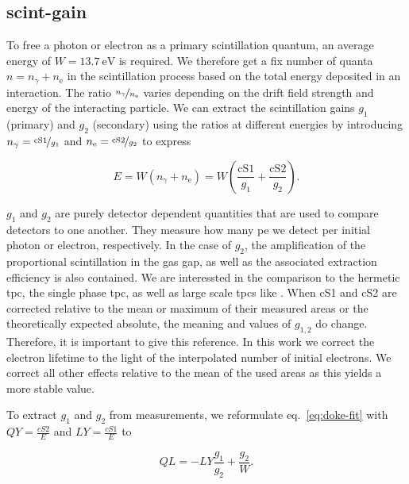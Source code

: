 
\FloatBarrier
\subsection{scint-gain}
\label{ssec:scint-gain}
\FloatBarrier


To free a photon or electron as a primary scintillation quantum, an average energy of $ W = \SI{13.7}{\electronvolt} $ is required.
We therefore get a fix number of quanta $ n = n_\gamma + n_\mathrm{e} $ in the scintillation process based on the total energy deposited in an interaction.
The ratio $ \nicefrac{n_\gamma}{n_\mathrm{e}} $ varies depending on the drift field strength and energy of the interacting particle.
We can extract the scintillation gains $ g_1 $ (primary) and $ g_2 $ (secondary) using the ratios at different energies by introducing $ n_\mathrm{\gamma} = \nicefrac{\mathrm{cS1}}{g_\mathrm{1}} $ and $ n_\mathrm{e} = \nicefrac{\mathrm{cS2}}{g_\mathrm{2}} $ to express

\begin{equation}
    E = W \left( n_\gamma + n_\mathrm{e} \right) = W \left( \frac{\mathrm{cS1}}{g_1} + \frac{\mathrm{cS2}}{g_2} \right).
    \label{eq:energy-correction}
\end{equation}

$ g_1 $ and $ g_2 $ are purely detector dependent quantities that are used to compare detectors to one another.
They measure how many \gls{pe} we detect per initial photon or electron, respectively.
In the case of $ g_2 $, the amplification of the proportional scintillation in the gas gap, as well as the associated extraction efficiency is also contained.
We are interessted in the comparison to the hermetic \gls{tpc}, the single phase \gls{tpc}, as well as large scale \glspl{tpc} like \nton.
When cS1 and cS2 are corrected relative to the mean or maximum of their measured areas or the theoretically expected absolute, the meaning and values of $ g_{1,2} $ do change.
Therefore, it is important to give this reference.
In this work we correct the electron lifetime to the light of the interpolated number of initial electrons.
We correct all other effects relative to the mean of the used areas as this yields a more stable value.

To extract $ g_1 $ and $ g_2 $ from measurements, we reformulate eq.~\ref{eq:doke-fit} with $ \mathit{QY} = \frac{cS2}{E} $ and $ \mathit{LY} = \frac{cS1}{E} $ to

\begin{equation}
    \mathit{QL} = - \mathit{LY} \frac{g_1}{g_2} + \frac{g_2}{W}.
    \label{eq:doke-fit}
\end{equation}

